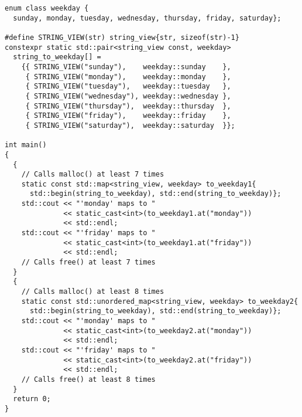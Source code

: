 \documentclass[a4paper,12pt]{article}
\begin{document}
\begin{spacing}{0.8}
\begin{lstlisting}
enum class weekday {
  sunday, monday, tuesday, wednesday, thursday, friday, saturday};

#define STRING_VIEW(str) string_view{str, sizeof(str)-1}
constexpr static std::pair<string_view const, weekday>
  string_to_weekday[] =
    {{ STRING_VIEW("sunday"),    weekday::sunday    },
     { STRING_VIEW("monday"),    weekday::monday    },
     { STRING_VIEW("tuesday"),   weekday::tuesday   },
     { STRING_VIEW("wednesday"), weekday::wednesday },
     { STRING_VIEW("thursday"),  weekday::thursday  },
     { STRING_VIEW("friday"),    weekday::friday    },
     { STRING_VIEW("saturday"),  weekday::saturday  }};

int main()
{
  {
    // Calls malloc() at least 7 times
    static const std::map<string_view, weekday> to_weekday1{
      std::begin(string_to_weekday), std::end(string_to_weekday)};
    std::cout << "'monday' maps to "
              << static_cast<int>(to_weekday1.at("monday"))
              << std::endl;
    std::cout << "'friday' maps to "
              << static_cast<int>(to_weekday1.at("friday"))
              << std::endl;
    // Calls free() at least 7 times
  }
  {
    // Calls malloc() at least 8 times
    static const std::unordered_map<string_view, weekday> to_weekday2{
      std::begin(string_to_weekday), std::end(string_to_weekday)};
    std::cout << "'monday' maps to "
              << static_cast<int>(to_weekday2.at("monday"))
              << std::endl;
    std::cout << "'friday' maps to "
              << static_cast<int>(to_weekday2.at("friday"))
              << std::endl;
    // Calls free() at least 8 times
  }
  return 0;
}
\end{lstlisting}
\end{spacing}
\end{document}
